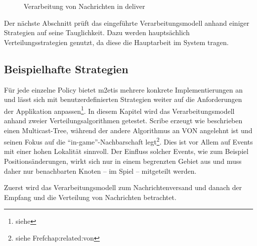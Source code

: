 \begin{figure}[htbp]
\centering
{}
\caption{Verarbeitung von Nachrichten in deliver}
\label{fig:processing_deliver}
\end{figure}

Der nächste Abschnitt prüft das eingeführte Verarbeitungsmodell anhand einiger Strategien auf seine Tauglichkeit. Dazu werden hauptsächlich Verteilungsstrategien genutzt, da diese die Hauptarbeit im System tragen.

\subsection*{Beispielhafte Strategien}
Für jede einzelne Policy bietet \ac{m2etis} mehrere konkrete Implementierungen an und lässt sich mit benutzerdefinierten Strategien weiter auf die Anforderungen der Applikation anpassen\footnote{siehe }. In diesem Kapitel wird das Verarbeitungsmodell anhand zweier Verteilungsalgorithmen getestet. Scribe \cite{Castro2002Scribe} erzeugt wie beschrieben einen Multicast-Tree, während der andere Algorithmus an VON \cite{Hu2006VON} angelehnt ist und seinen Fokus auf die \enquote{in-game}-Nachbarschaft legt\footnote{siehe Fref{chap:related:von}}. Dies ist vor Allem auf Events mit einer hohen Lokalität sinnvoll. Der Einfluss solcher Events, wie zum Beispiel Positionsänderungen, wirkt sich nur in einem begrenzten Gebiet aus und muss daher nur benachbarten Knoten -- im Spiel -- mitgeteilt werden.

Zuerst wird das Verarbeitungsmodell zum Nachrichtenversand und danach der Empfang und die Verteilung von Nachrichten betrachtet.

